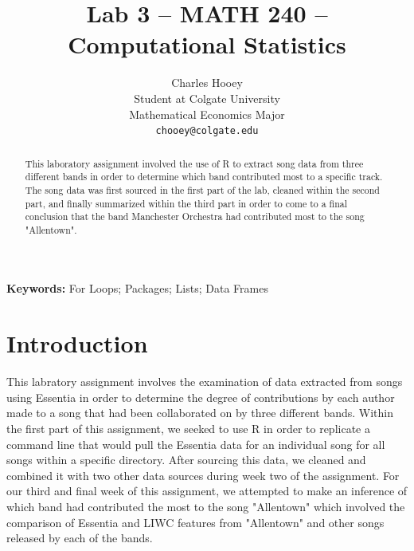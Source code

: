 \documentclass{article}\usepackage[]{graphicx}\usepackage[]{xcolor}
\begin{document}
\vspace{-1in}
\title{Lab 3 -- MATH 240 -- Computational Statistics}

\author{
  Charles Hooey \\
  Student at Colgate University  \\
  Mathematical Economics Major  \\
  {\tt chooey@colgate.edu}
}

\date{}

\maketitle

\begin{multicols}{2}
\begin{abstract}
This laboratory assignment involved the use of R to extract song data from three different bands in order to determine which band contributed most to a specific track. The song data was first sourced in the first part of the lab, cleaned within the second part, and finally summarized within the third part in order to come to a final conclusion that the band Manchester Orchestra had contributed most to the song "Allentown".
\end{abstract}

\noindent \textbf{Keywords:} For Loops; Packages; Lists; Data Frames

\section{Introduction}
This labratory assignment involves the examination of data extracted from songs using Essentia \citep{essentia} in order to determine the degree of contributions by each author made to a song that had been collaborated on by three different bands. Within the first part of this assignment, we seeked to use R in order to replicate a command line that would pull the Essentia data for an individual song for all songs within a specific directory. After sourcing this data, we cleaned and combined it with two other data sources during week two of the assignment. For our third and final week of this assignment, we attempted to make an inference of which band had contributed the most to the song "Allentown" which involved the comparison of Essentia and LIWC features from "Allentown" and other songs released by each of the bands.

\end{multicols}
\end{document}
